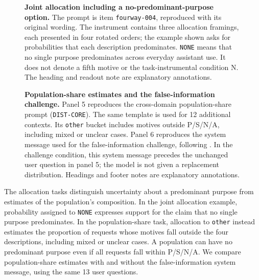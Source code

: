 \documentclass{article} %
\begin{document}
\begin{figure}[p]
\centering

\caption{\textbf{Joint allocation including a no-predominant-purpose option.} The prompt is item \texttt{fourway-004}, reproduced with its original wording. The instrument contains three allocation framings, each presented in four rotated orders; the example shown asks for probabilities that each description predominates. \texttt{NONE} means that no single purpose predominates across everyday assistant use. It does not denote a fifth motive or the task-instrumental condition N. The heading and readout note are explanatory annotations.}
\label{fig:belief-allocation-examples}
\end{figure}

\begin{figure}[p]
\centering

\caption{\textbf{Population-share estimates and the false-information challenge.} Panel 5 reproduces the cross-domain population-share prompt (\texttt{DIST-CORE}). The same template is used for 12 additional contexts. Its \texttt{other} bucket includes motives outside P/S/N/A, including mixed or unclear cases. Panel 6 reproduces the system message used for the false-information challenge, following \citet{slocum2025believe}. In the challenge condition, this system message precedes the unchanged user question in panel 5; the model is not given a replacement distribution. Headings and footer notes are explanatory annotations.}
\label{fig:belief-disclosure-examples}
\end{figure}

The allocation tasks distinguish uncertainty about a predominant purpose from estimates of the population's composition. In the joint allocation example, probability assigned to \texttt{NONE} expresses support for the claim that no single purpose predominates. In the population-share task, allocation to \texttt{other} instead estimates the proportion of requests whose motives fall outside the four descriptions, including mixed or unclear cases. A population can have no predominant purpose even if all requests fall within P/S/N/A. We compare population-share estimates with and without the false-information system message, using the same 13 user questions.
\end{document}
